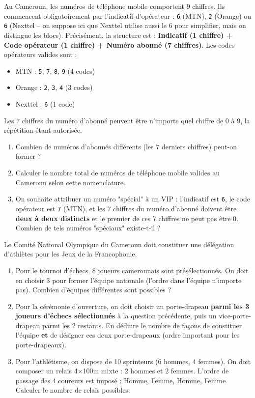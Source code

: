 \documentclass[11pt]{article}
\begin{document}
\begin{exercice}
Au Cameroun, les numéros de téléphone mobile comportent 9 chiffres. Ils commencent obligatoirement par l'indicatif d'opérateur : \texttt{6} (MTN), \texttt{2} (Orange) ou \texttt{6} (Nexttel -- on suppose ici que Nexttel utilise aussi le 6 pour simplifier, mais on distingue les blocs). 
Précisément, la structure est : \textbf{Indicatif (1 chiffre) + Code opérateur (1 chiffre) + Numéro abonné (7 chiffres)}.
Les codes opérateurs valides sont : 
\begin{itemize}
    \item MTN : \texttt{5}, \texttt{7}, \texttt{8}, \texttt{9} (4 codes)
    \item Orange : \texttt{2}, \texttt{3}, \texttt{4} (3 codes)
    \item Nexttel : \texttt{6} (1 code)
\end{itemize}
Les 7 chiffres du numéro d'abonné peuvent être n'importe quel chiffre de 0 à 9, la répétition étant autorisée.
\begin{enumerate}
    \item Combien de numéros d'abonnés différents (les 7 derniers chiffres) peut-on former ?
    \item Calculer le nombre total de numéros de téléphone mobile valides au Cameroun selon cette nomenclature.
    \item On souhaite attribuer un numéro "spécial" à un VIP : l'indicatif est \texttt{6}, le code opérateur est \texttt{7} (MTN), et les 7 chiffres du numéro d'abonné doivent être \textbf{deux à deux distincts} et le premier de ces 7 chiffres ne peut pas être 0. Combien de tels numéros "spéciaux" existe-t-il ?
\end{enumerate}
\end{exercice}

\begin{exercice}
Le Comité National Olympique du Cameroun doit constituer une délégation d'athlètes pour les Jeux de la Francophonie.
\begin{enumerate}
    \item Pour le tournoi d'échecs, 8 joueurs camerounais sont présélectionnés. On doit en choisir 3 pour former l'équipe nationale (l'ordre dans l'équipe n'importe pas). Combien d'équipes différentes sont possibles ?
    \item Pour la cérémonie d'ouverture, on doit choisir un porte-drapeau \textbf{parmi les 3 joueurs d'échecs sélectionnés} à la question précédente, puis un vice-porte-drapeau parmi les 2 restants. En déduire le nombre de façons de constituer l'équipe \textbf{et} de désigner ces deux porte-drapeaux (ordre important pour les porte-drapeaux).
    \item Pour l'athlétisme, on dispose de 10 sprinteurs (6 hommes, 4 femmes). On doit composer un relais 4$\times$100m mixte : 2 hommes et 2 femmes. L'ordre de passage des 4 coureurs est imposé : Homme, Femme, Homme, Femme. Calculer le nombre de relais possibles.
\end{enumerate}
\end{exercice}
\end{document}
